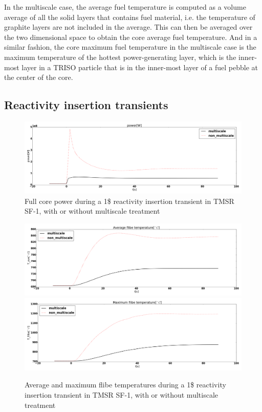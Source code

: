 \documentclass{elsarticle}
\begin{document}
In the multiscale case, the average fuel temperature is computed as a volume average of all the solid layers that contains fuel material, i.e. the temperature of graphite layers are not included in the average. This can then be averaged over the two dimensional space to obtain the core average fuel temperature. And in a similar fashion, the core maximum fuel temperature in the multiscale case is the maximum temperature of the hottest power-generating layer, which is the inner-most layer in a TRISO particle that is in the inner-most layer of a fuel pebble at the center of the core. 



\subsection{Reactivity insertion transients}


\begin{figure}
    \centering
    \includegraphics[width=\textwidth]{images/diffusion/tmsr/RI/compare_multiscale/power.png}
    \caption{Full core power during a 1\$ reactivity insertion transient in TMSR SF-1, with or without multiscale treatment}
    \label{fig:multi_comp_power_TMSR}
\end{figure}

\begin{figure}
    \centering
    \includegraphics[width=\textwidth]{images/diffusion/tmsr/RI/compare_multiscale/T_flibe_ave.png}
    \includegraphics[width=\textwidth]{images/diffusion/tmsr/RI/compare_multiscale/T_flibe_max.png}
    \caption{Average and maximum flibe temperatures during a 1\$ reactivity insertion transient in TMSR SF-1, with or without multiscale treatment}
    \label{fig:multi_comp_flibe_TMSR}
\end{figure}
\end{document}

